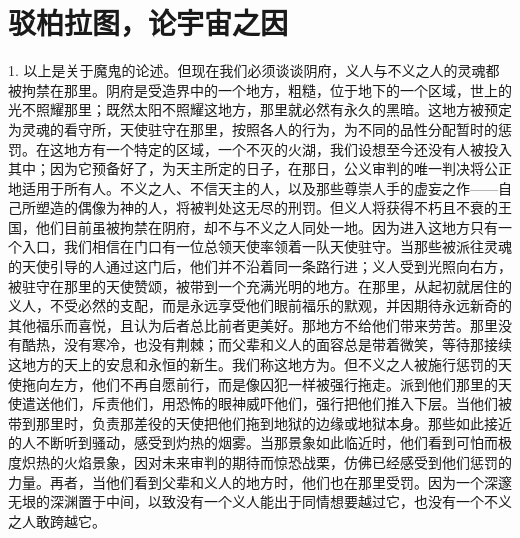 
\chapter{驳柏拉图，论宇宙之因}


1. 以上是关于魔鬼的论述。但现在我们必须谈谈阴府，义人与不义之人的灵魂都被拘禁在那里。阴府是受造界中的一个地方，粗糙，位于地下的一个区域，世上的光不照耀那里；既然太阳不照耀这地方，那里就必然有永久的黑暗。这地方被预定为灵魂的看守所，天使驻守在那里，按照各人的行为，为不同的品性分配暂时的惩罚。在这地方有一个特定的区域，一个不灭的火湖，我们设想至今还没有人被投入其中；因为它预备好了，为天主所定的日子，在那日，公义审判的唯一判决将公正地适用于所有人。不义之人、不信天主的人，以及那些尊崇人手的虚妄之作——自己所塑造的偶像为神的人，将被判处这无尽的刑罚。但义人将获得不朽且不衰的王国，他们目前虽被拘禁在阴府，却不与不义之人同处一地。因为进入这地方只有一个入口，我们相信在门口有一位总领天使率领着一队天使驻守。当那些被派往灵魂的天使引导的人通过这门后，他们并不沿着同一条路行进；义人受到光照向右方，被驻守在那里的天使赞颂，被带到一个充满光明的地方。在那里，从起初就居住的义人，不受必然的支配，而是永远享受他们眼前福乐的默观，并因期待永远新奇的其他福乐而喜悦，且认为后者总比前者更美好。那地方不给他们带来劳苦。那里没有酷热，没有寒冷，也没有荆棘；而父辈和义人的面容总是带着微笑，等待那接续这地方的天上的安息和永恒的新生。我们称这地方为。但不义之人被施行惩罚的天使拖向左方，他们不再自愿前行，而是像囚犯一样被强行拖走。派到他们那里的天使遣送他们，斥责他们，用恐怖的眼神威吓他们，强行把他们推入下层。当他们被带到那里时，负责那差役的天使把他们拖到地狱的边缘或地狱本身。那些如此接近的人不断听到骚动，感受到灼热的烟雾。当那景象如此临近时，他们看到可怕而极度炽热的火焰景象，因对未来审判的期待而惊恐战栗，仿佛已经感受到他们惩罚的力量。再者，当他们看到父辈和义人的地方时，他们也在那里受罚。因为一个深邃无垠的深渊置于中间，以致没有一个义人能出于同情想要越过它，也没有一个不义之人敢跨越它。\par

